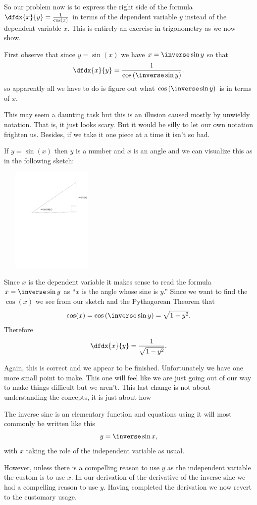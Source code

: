 
So our problem now is to express the right side of the formula
$\dfdx{x}{y} = \frac{1}{\cos(x)}$ in terms of the dependent variable
$y$ instead of the dependent variable $x.$ This is entirely an
exercise in trigonometry as we now show.

First observe that since $y=\sin(x)$ we have 
$
x=\inverse\sin y
$
so that 
$$
\dfdx{x}{y} = \frac{1}{\cos\left(\inverse\sin y\right)}.
$$
so apparently all we have to do is figure out what
$\cos\left(\inverse\sin y\right)$ is in terms of $x.$ 

This may seem a daunting task but this is an illusion caused mostly by
unwieldy notation. That is, it just looks scary. But it would be silly
to let our own notation frighten us. Besides, if we take it one piece
at a time it isn't so bad.

If $y=\sin(x)$ then $y$ is a number and $x$ is an angle and we can
visualize this as in the following sketch:

\centerline{\includegraphics*[height=2in,width=2in]{Figures/arcsin1}}

Since $x$ is the dependent variable it makes sense to read the formula
$x=\inverse\sin y$ as ``$x$ is the angle whose sine is $y$.'' Since we
want to find the $\cos(x)$ we see from our sketch and the Pythagorean
Theorem that 
$$
\cos(x)=\cos\left(\inverse\sin y\right) = \sqrt{1-y^2}.
$$
Therefore
$$
\dfdx{x}{y} = \frac{1}{\sqrt{1-y^2}}.
$$
\begin{mynotation}
  Again, this is correct and we appear to be finished. Unfortunately
  we have one more small point to make. This one will feel like we are
  just going out of our way to make things difficult but we
  aren't. This last change is not about understanding the concepts, it
  is just about how

  The inverse sine is an elementary function and equations using it
  will most commonly be written like this
$$
y = \inverse\sin x,
$$
with $x$ taking the role of the independent variable as usual.  

However, unless there is a compelling reason to use $y$ as the
independent variable the custom is to use $x.$ In our derivation of
the derivative of the inverse sine we had a compelling reason to use
$y.$ Having completed the derivation we now revert to the customary
usage.
\end{mynotation}

